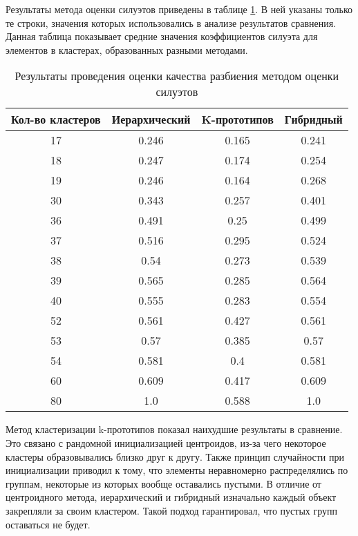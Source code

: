 Результаты метода оценки силуэтов приведены в таблице \ref{tbl:test_silhouettes}. В ней указаны только те строки, значения которых использовались в анализе результатов сравнения. Данная таблица показывает средние значения коэффициентов силуэта для элементов в кластерах, образованных разными методами.
\begin{table}[H]
    \centering
	\caption{Результаты проведения оценки качества разбиения методом оценки силуэтов}
    \label{tbl:test_silhouettes}
	\begin{tabular}{|c|c|c|c|}
        \hline
        \textbf{Кол-во кластеров} & \textbf{Иерархический} & \textbf{K-прототипов} & \textbf{Гибридный} \\ \hline
        17    &    0.246    &   0.165    &  0.241  \\ \hline
        18    &    0.247    &   0.174    &  0.254  \\ \hline
        19    &    0.246    &   0.164    &  0.268  \\ \hline
        30    &    0.343    &   0.257    &  0.401  \\ \hline
        36    &    0.491    &    0.25    &  0.499  \\ \hline
        37    &    0.516    &   0.295    &  0.524  \\ \hline
        38    &     0.54    &   0.273    &  0.539  \\ \hline
        39    &    0.565    &   0.285    &  0.564  \\ \hline
        40    &    0.555    &   0.283    &  0.554  \\ \hline
        52    &    0.561    &   0.427    &  0.561  \\ \hline
        53    &     0.57    &   0.385    &   0.57  \\ \hline
        54    &    0.581    &    0.4     &  0.581  \\ \hline
        60    &    0.609    &   0.417    &  0.609  \\ \hline
        80    &     1.0     &   0.588    &   1.0   \\ \hline
    \end{tabular}
\end{table}

Метод кластеризации k-прототипов показал наихудшие результаты в сравнение. Это связано с рандомной инициализацией центроидов, из-за чего некоторое кластеры образовывались близко друг к другу. Также принцип случайности при инициализации приводил к тому, что элементы неравномерно распределялись по группам, некоторые из которых вообще оставались пустыми. В отличие от центроидного метода, иерархический и гибридный изначально каждый объект закрепляли за своим кластером. Такой подход гарантировал, что пустых групп оставаться не будет. 

